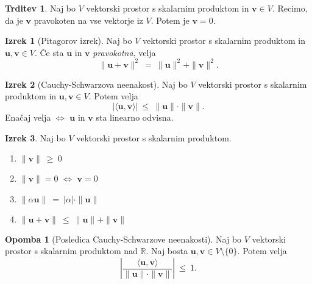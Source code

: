 \documentclass[11pt]{article}
\newcommand{\R}{\mathbb{R}}
\newcommand{\ls}{\langle}
\newcommand{\rs}{\rangle}
\renewcommand{\u}{\mathbf{u}}
\newcommand{\vv}{\mathbf{v}}
\newcommand{\0}{\mathbf{0}}
\theoremstyle{definition}
\theoremstyle{definition}
\newtheorem{trditev}{Trditev}[section]
\theoremstyle{definition}
\newtheorem{izrek}{Izrek}[section]
\theoremstyle{definition}
\newtheorem*{opomba}{Opomba}
\begin{document}
\begin{trditev}

Naj bo $V$ vektorski prostor s skalarnim produktom in $\vv \in V$. Recimo, da je $\vv$ pravokoten na vse vektorje iz $V$. Potem je $\vv = 0$.

\end{trditev}
\vspace{0.5cm}

\begin{izrek}[Pitagorov izrek]

Naj bo $V$ vektorski prostor s skalarnim produktom in $\u,\vv \in V$. Če sta $\u$ in $\vv$ \textit{pravokotna}, velja
$$\|\u + \vv\|^2 ~=~ \|\u\|^2 + \|\vv\|^2.$$

\end{izrek}
\vspace{0.5cm}

\begin{izrek}[Cauchy-Schwarzova neenakost]

Naj bo $V$ vektorski prostor s skalarnim produktom in $\u,\vv \in V$. Potem velja
$$|\ls \u, \vv \rs| ~\leq~ \|\u\| \cdot \|\vv\|.$$
Enačaj velja $\iff$ $\u$ in $\vv$ sta linearno odvisna.

\end{izrek}
\vspace{0.5cm}

\begin{izrek}

Naj bo $V$ vektorski prostor s skalarnim produktom.
\begin{enumerate}
	\item $\|\vv\| ~\geq~ 0$
	\item $\|\vv\| = 0$ $\iff$ $\vv = 0$
	\item $\|\alpha\u\| ~=~ |\alpha|\cdot\|\u\|$
	\item $\|\u + \vv\| ~\leq~ \|\u\| + \|\vv\|$
\end{enumerate}

\end{izrek}
\vspace{0.5cm}

\begin{opomba}[Posledica Cauchy-Schwarzove neenakosti]

Naj bo $V$ vektorski prostor s skalarnim produktom nad $\R$. Naj bosta $\u,\vv \in V\setminus\{0\}$. Potem velja
$$\left| \frac{\ls \u, \vv \rs}{\|\u\| \cdot \|\vv\|} \right| ~\leq~ 1.$$

\end{opomba}
\vspace{0.5cm}
\end{document}

